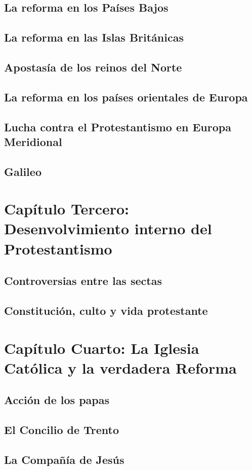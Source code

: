 \raggedbottom{} \documentclass[12pt, a4paper, openany]{book} %
\begin{document}
\section{La reforma en los Países Bajos}
\section{La reforma en las Islas Británicas}
\section{Apostasía de los reinos del Norte}
\section{La reforma en los países orientales de Europa}
\section{Lucha contra el Protestantismo en Europa Meridional}
\section{Galileo}
\chapter{Capítulo Tercero: Desenvolvimiento interno del Protestantismo}
\section{Controversias entre las sectas}
\section{Constitución, culto y vida protestante}
\chapter{Capítulo Cuarto: La Iglesia Católica y la verdadera Reforma}
\section{Acción de los papas}
\section{El Concilio de Trento}
\section{La Compañía de Jesús}
\end{document}
